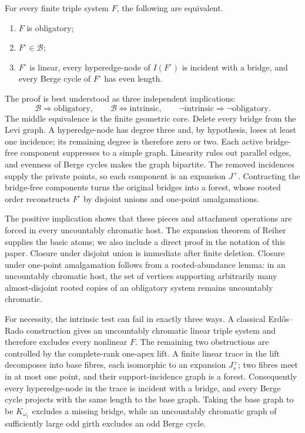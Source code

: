 \begin{theoremA}\label{theorem-a-reader-first}
For every finite triple system $F$, the following are equivalent.
\begin{enumerate}
\item $F$ is obligatory;
\item $F^\circ\in\mathcal B$;
\item $F^\circ$ is linear, every hyperedge-node of $I(F^\circ)$ is incident
with a bridge, and every Berge cycle of $F^\circ$ has even length.
\end{enumerate}
\end{theoremA}

The proof is best understood as three independent implications:
\[
  \mathcal B\Longrightarrow\text{obligatory},
  \qquad
  \mathcal B\Longleftrightarrow\text{intrinsic},
  \qquad
  \neg\text{intrinsic}\Longrightarrow\neg\text{obligatory}.
\]
The middle equivalence is the finite geometric core.  Delete every bridge from
the Levi graph.  A hyperedge-node has degree three and, by hypothesis, loses at
least one incidence; its remaining degree is therefore zero or two.  Each
active bridge-free component suppresses to a simple graph.  Linearity rules out
parallel edges, and evenness of Berge cycles makes the graph bipartite.  The
removed incidences supply the private points, so each component is an expansion
$J^+$.  Contracting the bridge-free components turns the original bridges into
a forest, whose rooted order reconstructs $F^\circ$ by disjoint unions and
one-point amalgamations.

The positive implication shows that these pieces and attachment operations are
forced in every uncountably chromatic host.  The expansion theorem of
Reiher~\citep[Theorem~1.2]{reiher2024} supplies the basic atoms; we also include
a direct proof in the notation of this paper.  Closure under disjoint union is
immediate after finite deletion.  Closure under one-point amalgamation follows
from a rooted-abundance lemma: in an uncountably chromatic host, the set of
vertices supporting arbitrarily many almost-disjoint rooted copies of an
obligatory system remains uncountably chromatic.

For necessity, the intrinsic test can fail in exactly three ways.  A classical
Erd\H{o}s--Rado construction gives an uncountably chromatic linear triple system
and therefore excludes every nonlinear $F$.  The remaining two obstructions
are controlled by the complete-rank one-apex lift.  A finite linear trace in the
lift decomposes into base fibres, each isomorphic to an expansion $J_s^+$; two
fibres meet in at most one point, and their support-incidence graph is a forest.
Consequently every hyperedge-node in the trace is incident with a bridge, and
every Berge cycle projects with the same length to the base graph.  Taking the
base graph to be $K_{\omega_1}$ excludes a missing bridge, while an
uncountably chromatic graph of sufficiently large odd girth excludes an odd
Berge cycle.

